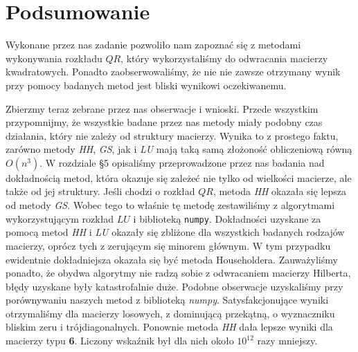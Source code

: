 \section{Podsumowanie}
Wykonane przez nas zadanie pozwoliło nam zapoznać się z metodami wykonywania rozkładu
$QR$, który wykorzystaliśmy do odwracania macierzy kwadratowych. Ponadto zaobserwowaliśmy,
że nie nie zawsze otrzymany wynik przy pomocy badanych metod jest bliski wynikowi oczekiwanemu.

Zbierzmy teraz zebrane przez nas obserwacje i wnioski. Przede wszystkim przypomnijmy, że wszystkie
badane przez nas metody miały podobny czas działania, który nie zależy od struktury macierzy.
Wynika to z prostego faktu, zarówno metody \textit{HH}, \textit{GS}, jak i \textit{LU} mają taką
samą złożoność obliczeniową równą $O(n^3)$. W rozdziale \S5 opisaliśmy przeprowadzone przez nas
badania nad dokładnością metod, która okazuje się zależeć nie tylko od wielkości macierze, ale
także od jej struktury. Jeśli chodzi o rozkład $QR$, metoda \textit{HH} okazała się lepsza od
metody \textit{GS}. Wobec tego to właśnie tę metodę zestawiliśmy z algorytmami wykorzystującym
rozkład $LU$ i biblioteką \verb|numpy|. Dokładności uzyskane za pomocą metod \textit{HH} i
\textit{LU} okazały się zbliżone dla wszystkich badanych rodzajów macierzy, oprócz tych z zerującym
się minorem głównym. W tym przypadku ewidentnie dokładniejsza okazała się być metoda Householdera.
Zauważyliśmy ponadto, że obydwa algorytmy nie radzą sobie z odwracaniem macierzy Hilberta, błędy
uzyskane były katastrofalnie duże. Podobne obserwacje uzyskaliśmy przy porównywaniu naszych metod z
biblioteką \textit{numpy}. Satysfakcjonujące wyniki otrzymaliśmy dla macierzy losowych, z dominującą
przekątną, o wyznaczniku bliskim zeru i trójdiagonalnych. Ponownie metoda \textit{HH} dała lepsze wyniki dla
macierzy typu \textbf{6}. Liczony wskaźnik był dla nich około $10^{12}$ razy mniejszy.
